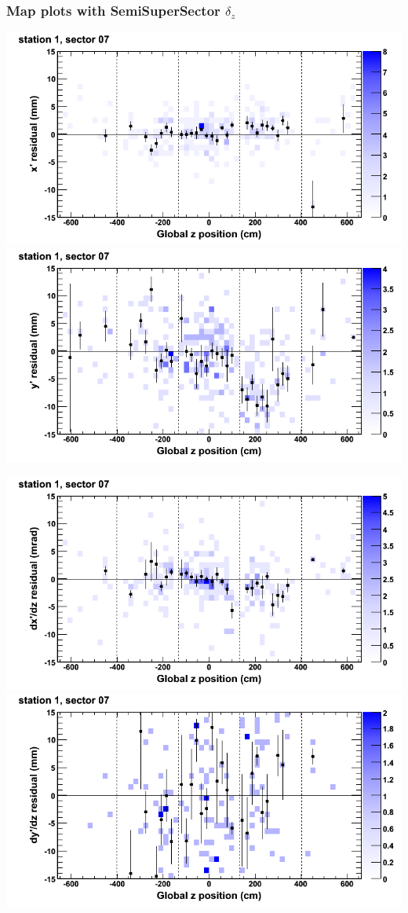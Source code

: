 \documentclass[compress]{beamer}
\begin{document}
\begin{frame}
\frametitle{Map plots with SemiSuperSector $\delta_z$}
\includegraphics[width=0.5\linewidth]{zfit_mapplots/DTvsz_st1sec07_x.png}
\includegraphics[width=0.5\linewidth]{zfit_mapplots/DTvsz_st1sec07_y.png}

\includegraphics[width=0.5\linewidth]{zfit_mapplots/DTvsz_st1sec07_dxdz.png}
\includegraphics[width=0.5\linewidth]{zfit_mapplots/DTvsz_st1sec07_dydz.png}
\end{frame}
\end{document}
